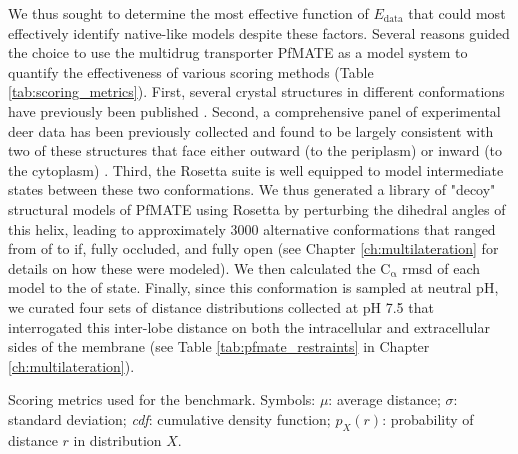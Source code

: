 We thus sought to determine the most effective function of $E_{\mathup{data}}$ that could most effectively identify native-like models despite these factors. Several reasons guided the choice to use the multidrug transporter PfMATE as a model system to quantify the effectiveness of various scoring methods (Table \ref{tab:scoring_metrics}). First, several crystal structures in different conformations have previously been published \citep*{Tanaka2013, Zakrzewska2019}. Second, a comprehensive panel of experimental \gls{deer} data has been previously collected and found to be largely consistent with two of these structures that face either outward (to the periplasm) or inward (to the cytoplasm) \citep*{Jagessar2020}. Third, the Rosetta suite is well equipped to model intermediate states between these two conformations. We thus generated a library of "decoy" structural models of PfMATE using Rosetta by perturbing the dihedral angles of this helix, leading to approximately 3000 alternative conformations that ranged from \gls{of} to \gls{if}, fully occluded, and fully open (see Chapter \ref{ch:multilateration} for details on how these were modeled). We then calculated the $\mathrm{C_{\upalpha}}$ \gls{rmsd} of each model to the \gls{of} state. Finally, since this conformation is sampled at neutral pH, we curated four sets of distance distributions collected at pH 7.5 that interrogated this inter-lobe distance on both the intracellular and extracellular sides of the membrane (see Table \ref{tab:pfmate_restraints} in Chapter \ref{ch:multilateration}). 



\begin{table}[b!]
\scriptsize
\renewcommand{\tabcolsep}{0.15cm}
\centering
\caption[Scoring metrics used for the benchmark.]{Scoring metrics used for the benchmark. Symbols: $\mu$: average distance; $\sigma$: standard deviation; \emph{cdf}: cumulative density function; $p_{\mathit{X}} \left( r \right)$: probability of distance $r$ in distribution $X$.}

\label{tab:scoring_metrics}
\end{table}

